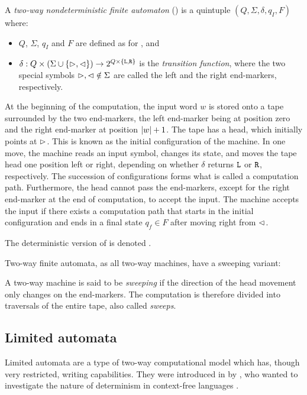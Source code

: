 \begin{defn}
	A \emph{two-way nondeterministic finite automaton} (\TNFA) is a quintuple $(Q,\Sigma,\delta,q_I,F)$ where:
	\begin{itemize}
		\item $Q$, $\Sigma$, $q_I$ and $F$ are defined as for \ONFAs, and
		\item $\delta:Q\times(\Sigma\cup\{\rhd,\lhd\})\to2^{Q\times\{\mathtt L,\mathtt R\}}$ is the \emph{transition function}, where the two special symbols $\rhd,\lhd\notin\Sigma$ are called the left and the right end-markers, respectively.
	\end{itemize}
	At the beginning of the computation, the input word $w$ is stored onto a tape surrounded by the two end-markers, the left end-marker being at position zero and the right end-marker at position $\lvert w \rvert+1$.
	The tape has a head, which initially points at $\rhd$.
	This is known as the initial configuration of the machine.
	In one move, the machine reads an input symbol, changes its state, and moves the tape head one position left or right, depending on whether $\delta$ returns $\mathtt L$ or $\mathtt R$, respectively.
	The succession of configurations forms what is called a computation path.
	Furthermore, the head cannot pass the end-markers, except for the right end-marker at the end of computation, to accept the input.
	The machine accepts the input if there exists a computation path that starts in the initial configuration and ends in a final state $q_f\in F$ after moving right from $\lhd$.

	\noindent The deterministic version of \TNFA is denoted \TDFA.
\end{defn}

Two-way finite automata, as all two-way machines, have a sweeping variant:
\begin{defn}\label{def:sweeping}
	A two-way machine is said to be \emph{sweeping} if the direction of the head movement only changes on the end-markers.
	The computation is therefore divided into traversals of the entire tape, also called \emph{sweeps}.
\end{defn}


\subsection{Limited automata}
Limited automata are a type of two-way computational model which has, though very restricted, writing capabilities.
They were introduced in \citeyear{Hib67} by \citeauthor{Hib67}, who wanted to investigate the nature of determinism in context-free languages \cite{Hib67}.

